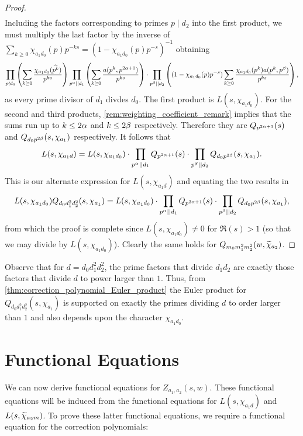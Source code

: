 \documentclass[12pt,reqno,oneside]{amsart}
\begin{document}
\begin{proof}
\begin{align*}
        \end{align*}
        Including the factors corresponding to primes $p \mid d_{2}$ into the first product, we must multiply the last factor by the inverse of $\sum_{k \ge 0}\chi_{a_{1}d_{0}}(p)p^{-ks} = (1-\chi_{a_{1}d_{0}}(p)p^{-s})^{-1}$ obtaining
        \[
            \prod_{p \nmid d_{0}}\left(\sum_{k \ge 0}\frac{\chi_{a_{1}d_{0}}(\widehat{p^{k}})}{p^{ks}}\right)\prod_{p^{\alpha} \mid\mid d_{1}}\left(\sum_{k \ge 0}\frac{a(p^{k},p^{2\alpha+1})}{p^{ks}}\right) \cdot \prod_{p^{\beta} \mid\mid d_{2}}\left((1-\chi_{a_{1}d_{0}}(p)p^{-s})\sum_{k \ge 0}\frac{\chi_{a_{1}d_{0}}(p^{k})a(p^{k},p^{\beta})}{p^{ks}}\right),
        \]
        as every prime divisor of $d_{1}$ divdes $d_{0}$. The first product is $L(s,\chi_{a_{1}d_{0}})$. For the second and third products, \cref{rem:weighting_coefficient_remark} implies that the sums run up to $k \le 2\alpha$ and $k \le 2\beta$ respectively. Therefore they are $Q_{p^{2\alpha+1}}(s)$ and $Q_{d_{0}p^{2\beta}}(s,\chi_{a_{1}})$ respectively. It follows that
        \[
            L(s,\chi_{a_{1}d}) = L(s,\chi_{a_{1}d_{0}}) \cdot \prod_{p^{\alpha} \mid\mid d_{1}}Q_{p^{2\alpha+1}}(s) \cdot \prod_{p^{\beta} \mid\mid d_{2}}Q_{d_{0}p^{2\beta}}(s,\chi_{a_{1}}).
        \]
        This is our alternate expression for $L(s,\chi_{a_{1}d})$ and equating the two results in
        \[
            L(s,\chi_{a_{1}d_{0}})Q_{d_{0}d_{1}^{2}d_{2}^{2}}(s,\chi_{a_{1}}) = L(s,\chi_{a_{1}d_{0}}) \cdot \prod_{p^{\alpha} \mid\mid d_{1}}Q_{p^{2\alpha+1}}(s) \cdot \prod_{p^{\beta} \mid\mid d_{2}}Q_{d_{0}p^{2\beta}}(s,\chi_{a_{1}}),
        \]
        from which the proof is complete since $L(s,\chi_{a_{1}d_{0}}) \neq 0$ for $\Re(s) > 1$ (so that we may divide by $L(s,\chi_{a_{1}d_{0}})$). Clearly the same holds for $Q_{m_{0}m_{1}^{2}m_{2}^{2}}(w,\widetilde{\chi}_{a_{2}})$.
    \end{proof}

    Observe that for $d = d_{0}d_{1}^{2}d_{2}^{2}$, the prime factors that divide $d_{1}d_{2}$ are exactly those factors that divide $d$ to power larger than $1$. Thus, from \cref{thm:correction_polynomial_Euler_product} the Euler product for $Q_{d_{0}d_{1}^{2}d_{2}^{2}}(s,\chi_{a_{1}})$ is supported on exactly the primes dividing $d$ to order larger than $1$ and also depends upon the character $\chi_{a_{1}d_{0}}$.
\section*{Functional Equations}
    We can now derive functional equations for $Z_{a_{1},a_{2}}(s,w)$. These functional equations will be induced from the functional equations for $L(s,\chi_{a_{1}d})$ and $L(s,\widetilde{\chi}_{a_{2}m})$. To prove these latter functional equations, we require a functional equation for the correction polynomials:
\end{document}
